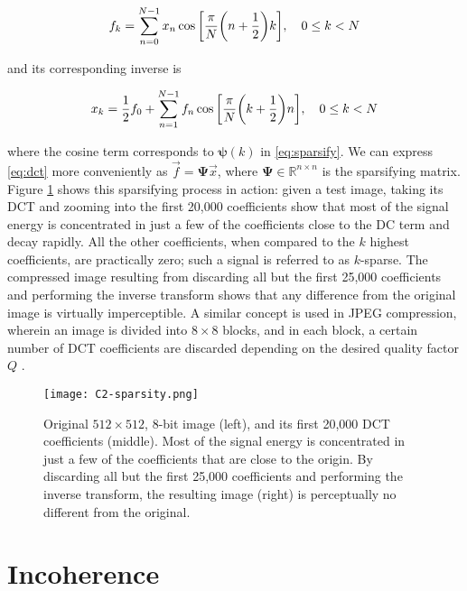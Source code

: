 \begin{equation}\label{eq:dct}
	f_k = \sum_{n=0}^{N-1} x_n \cos\qty[\frac{\pi}{N}\qty(n + \frac{1}{2})k] , \quad 0 \leq k < N
\end{equation}

\noindent and its corresponding inverse is

\begin{equation}\label{eq:idct}
	x_k = \frac{1}{2}f_0 + \sum_{n=1}^{N-1} f_n \cos\qty[\frac{\pi}{N} \qty(k + \frac{1}{2})n] , \quad 0 \leq k < N
\end{equation}

\noindent where the cosine term corresponds to $\bm\psi(k)$ in \eqref{eq:sparsify}. We can express \eqref{eq:dct} more conveniently as $\vec{f} = \bm\Psi \vec{x}$, where $\bm\Psi \in \mathbb{R}^{n \times n}$ is the sparsifying matrix. Figure \ref{fig:sparsity} shows this sparsifying process in action: given a test image, taking its DCT and zooming into the first 20,000 coefficients show that most of the signal energy is concentrated in just a few of the coefficients close to the DC term and decay rapidly. All the other coefficients, when compared to the $k$ highest coefficients, are practically zero; such a signal is referred to as $k$-sparse. The compressed image resulting from discarding all but the first 25,000 coefficients and performing the inverse transform shows that any difference from the original image is virtually imperceptible. A similar concept is used in JPEG compression, wherein an image is divided into $8 \times 8$ blocks, and in each block, a certain number of DCT coefficients are discarded depending on the desired quality factor $Q$ \cite{itu-jpeg}.

\begin{figure}[htb]
	\texttt{[image: C2-sparsity.png]}
	\caption{Original $512 \times 512$, 8-bit image (left), and its first 20,000 DCT coefficients (middle). Most of the signal energy is concentrated in just a few of the coefficients that are close to the origin. By discarding all but the first 25,000 coefficients and performing the inverse transform, the resulting image (right) is perceptually no different from the original.}
	\label{fig:sparsity}
\end{figure}


\section{Incoherence}
\label{sec:incoherence}

